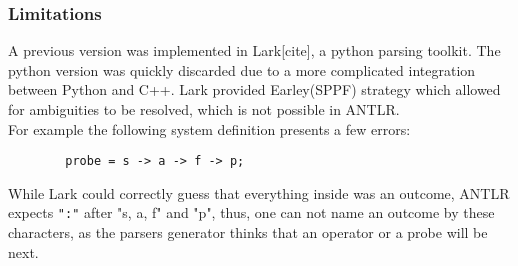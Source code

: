     \subsubsection{Limitations}
        A previous version was implemented in Lark[cite], a python parsing toolkit. The python version was quickly discarded due to a more complicated integration between Python and C++. Lark provided Earley(SPPF) strategy which allowed for ambiguities to be resolved, which is not possible in ANTLR. \\
        For example the following system definition presents a few errors:
        \begin{verbatim}
        probe = s -> a -> f -> p;
        \end{verbatim}
    While Lark could correctly guess that everything inside was an outcome, ANTLR expects \texttt{":"} after "s, a, f" and "p", thus, one can not name an outcome by these characters, as the parsers generator thinks that an operator or a probe will be next.
   
